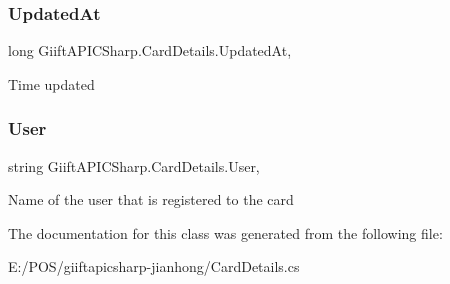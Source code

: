 \subsubsection{\texorpdfstring{Updated\+At}{UpdatedAt}}
{\footnotesize\ttfamily long Giift\+A\+P\+I\+C\+Sharp.\+Card\+Details.\+Updated\+At\hspace{0.3cm}{\ttfamily [get]}, {\ttfamily [set]}}



Time updated 

\mbox{\label{class_giift_a_p_i_c_sharp_1_1_card_details_afc8c9fb2688cf773a6731b28b8878de7}} 
\subsubsection{\texorpdfstring{User}{User}}
{\footnotesize\ttfamily string Giift\+A\+P\+I\+C\+Sharp.\+Card\+Details.\+User\hspace{0.3cm}{\ttfamily [get]}, {\ttfamily [set]}}



Name of the user that is registered to the card 



The documentation for this class was generated from the following file\+:\begin{DoxyCompactItemize}
\item 
E\+:/\+P\+O\+S/giiftapicsharp-\/jianhong/Card\+Details.\+cs\end{DoxyCompactItemize}
